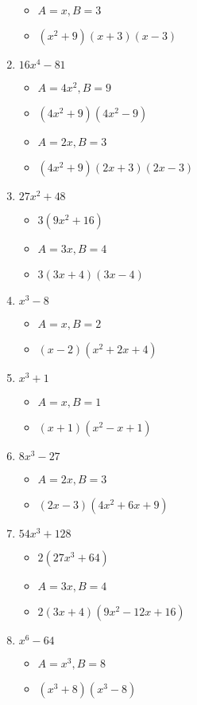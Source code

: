 \documentclass{article}
\begin{document}
\begin{enumerate}
\begin{itemize}
  \item $A=x, B=3$
  \item $(x^{2}+9)(x+3)(x-3)$
  \end{itemize}
\item $16x^{4} - 81$
  \begin{itemize}
  \item $A=4x^{2}, B=9$
  \item $(4x^{2}+9)(4x^{2}-9)$
  \item $A=2x, B=3$
  \item $(4x^{2}+9)(2x+3)(2x-3)$
  \end{itemize}
\item $27x^{2} + 48$
  \begin{itemize}
  \item $3(9x^{2}+16)$
  \item $A=3x, B=4$
  \item $3(3x+4)(3x-4)$
  \end{itemize}
\item $x^{3} - 8$
  \begin{itemize}
  \item $A=x, B=2$
  \item $(x-2)(x^{2}+2x+4)$
  \end{itemize}
\item $x^{3} + 1$
  \begin{itemize}
  \item $A=x, B=1$
  \item $(x+1)(x^{2}-x+1)$
  \end{itemize}
\item $8x^{3} - 27$
  \begin{itemize}
  \item $A=2x, B=3$
  \item $(2x-3)(4x^{2}+6x+9)$
  \end{itemize}
\item $54x^{3} + 128$
  \begin{itemize}
  \item $2(27x^{3}+64)$
  \item $A=3x, B=4$
  \item $2(3x+4)(9x^{2}-12x+16)$
  \end{itemize}
\item $x^{6} - 64$
  \begin{itemize}
  \item $A=x^{3}, B=8$
  \item $(x^{3}+8)(x^{3}-8)$

\end{itemize}
\end{enumerate}
\end{document}

